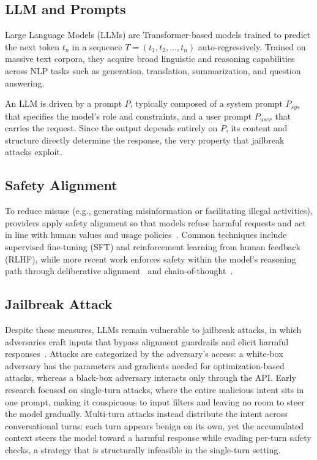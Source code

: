 \documentclass[a4paper,fleqn]{cas-sc}
\begin{document}
\subsection{LLM and Prompts}

Large Language Models (LLMs) are Transformer-based models trained to predict the next token $t_n$ in a sequence $T = (t_1, t_2, \dots, t_n)$ auto-regressively.
Trained on massive text corpora, they acquire broad linguistic and reasoning capabilities across NLP tasks such as generation, translation, summarization, and question answering.

An LLM is driven by a prompt $P$, typically composed of a system prompt $P_{sys}$ that specifies the model's role and constraints, and a user prompt $P_{user}$ that carries the request.
Since the output depends entirely on $P$, its content and structure directly determine the response, the very property that jailbreak attacks exploit.

\subsection{Safety Alignment}

To reduce misuse (e.g., generating misinformation or facilitating illegal activities), providers apply safety alignment so that models refuse harmful requests and act in line with human values and usage policies~\cite{instructgpt}.
Common techniques include supervised fine-tuning (SFT) and reinforcement learning from human feedback (RLHF), while more recent work enforces safety within the model's reasoning path through deliberative alignment~\cite{deliberative} and chain-of-thought~\cite{CoT}.

\subsection{Jailbreak Attack}

Despite these measures, LLMs remain vulnerable to jailbreak attacks, in which adversaries craft inputs that bypass alignment guardrails and elicit harmful responses~\cite{jailbroken}.
Attacks are categorized by the adversary's access: a white-box adversary has the parameters and gradients needed for optimization-based attacks, whereas a black-box adversary interacts only through the API.
Early research focused on single-turn attacks, where the entire malicious intent sits in one prompt, making it conspicuous to input filters and leaving no room to steer the model gradually.
Multi-turn attacks instead distribute the intent across conversational turns: each turn appears benign on its own, yet the accumulated context steers the model toward a harmful response while evading per-turn safety checks, a strategy that is structurally infeasible in the single-turn setting.
\end{document}

